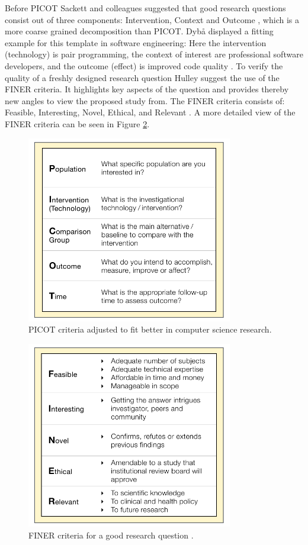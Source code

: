 Before PICOT Sackett and colleagues suggested that good research questions consist out of three components: Intervention, Context and Outcome \cite{Sackett2000}, which is a more coarse grained decomposition than PICOT. Dyb{\aa} \etal displayed a fitting example for this template in software engineering:  \cite[p. 60]{Dyba2005} Here the intervention (technology) is pair programming, the context of interest are professional software developers, and the outcome (effect) is improved code quality \cite{Dyba2005}. To verify the quality of a freshly designed research question Hulley \etal suggest the use of the FINER criteria. It highlights key aspects of the question and provides thereby new angles to view the proposed study from. The FINER criteria consists of: Feasible, Interesting, Novel, Ethical, and Relevant \cite{Farrugia2009}. A more detailed view of the FINER criteria can be seen in Figure \ref{fig:FINER}.   

\begin{figure}
	\centering
	\includegraphics[width=9cm]{figures/picot.pdf}
	\caption{PICOT criteria adjusted to fit better in computer science research.}
	\label{fig:PICOT}
\end{figure}

\begin{figure}
	\centering
	\includegraphics[width=9cm]{figures/finer.pdf}
	\caption{FINER criteria for a good research question \cite{Farrugia2009}.}
	\label{fig:FINER}
\end{figure}

